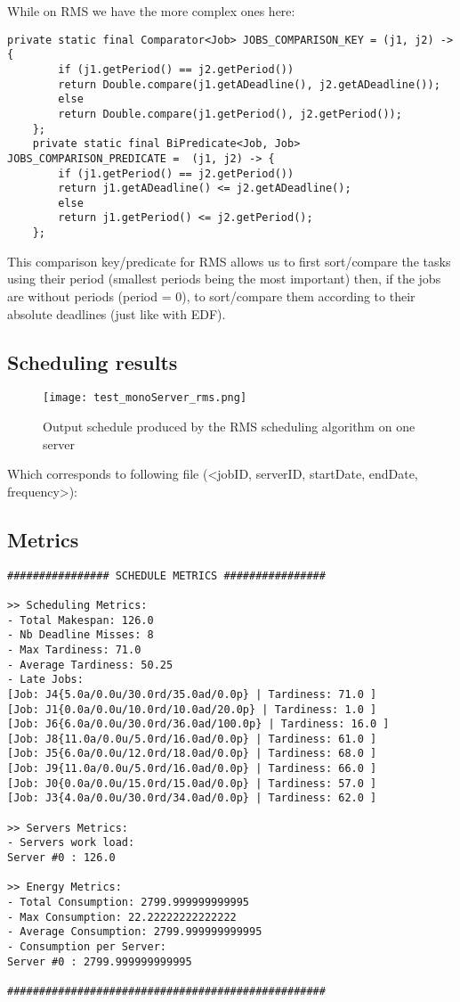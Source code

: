 \documentclass[./report.tex]{subfiles}
\begin{document}
While on RMS we have the more complex ones here:
\begin{lstlisting}[style=Java, caption={Comparison key and predicate of RMS}]
	private static final Comparator<Job> JOBS_COMPARISON_KEY = (j1, j2) -> {
		if (j1.getPeriod() == j2.getPeriod())
		return Double.compare(j1.getADeadline(), j2.getADeadline());
		else
		return Double.compare(j1.getPeriod(), j2.getPeriod());
	};
	private static final BiPredicate<Job, Job> JOBS_COMPARISON_PREDICATE =  (j1, j2) -> {
		if (j1.getPeriod() == j2.getPeriod())
		return j1.getADeadline() <= j2.getADeadline();
		else
		return j1.getPeriod() <= j2.getPeriod();
	};
\end{lstlisting}

This comparison key/predicate for RMS allows us to first sort/compare the tasks using their period (smallest periods being the most important) then, if the jobs are without periods (period = 0), to sort/compare them according to their absolute deadlines (just like with EDF).

\newpage
\subsection{Scheduling results}
\begin{figure}[!h]
	\center
	\texttt{[image: test\_monoServer\_rms.png]}
	\caption{Output schedule produced by the RMS scheduling algorithm on one server}
	\label{fig:monoServer_rms} 
\end{figure}

Which corresponds to following file (<jobID, serverID, startDate, endDate, frequency>):


\newpage
\subsection{Metrics}
\begin{lstlisting}[style=txt, caption={Metrics for RMS on a single server}]
################ SCHEDULE METRICS ################

>> Scheduling Metrics: 
- Total Makespan: 126.0
- Nb Deadline Misses: 8
- Max Tardiness: 71.0
- Average Tardiness: 50.25
- Late Jobs: 
[Job: J4{5.0a/0.0u/30.0rd/35.0ad/0.0p} | Tardiness: 71.0 ]
[Job: J1{0.0a/0.0u/10.0rd/10.0ad/20.0p} | Tardiness: 1.0 ]
[Job: J6{6.0a/0.0u/30.0rd/36.0ad/100.0p} | Tardiness: 16.0 ]
[Job: J8{11.0a/0.0u/5.0rd/16.0ad/0.0p} | Tardiness: 61.0 ]
[Job: J5{6.0a/0.0u/12.0rd/18.0ad/0.0p} | Tardiness: 68.0 ]
[Job: J9{11.0a/0.0u/5.0rd/16.0ad/0.0p} | Tardiness: 66.0 ]
[Job: J0{0.0a/0.0u/15.0rd/15.0ad/0.0p} | Tardiness: 57.0 ]
[Job: J3{4.0a/0.0u/30.0rd/34.0ad/0.0p} | Tardiness: 62.0 ]

>> Servers Metrics: 
- Servers work load:
Server #0 : 126.0

>> Energy Metrics: 
- Total Consumption: 2799.999999999995
- Max Consumption: 22.22222222222222
- Average Consumption: 2799.999999999995
- Consumption per Server: 
Server #0 : 2799.999999999995

##################################################
\end{lstlisting}
\end{document}
